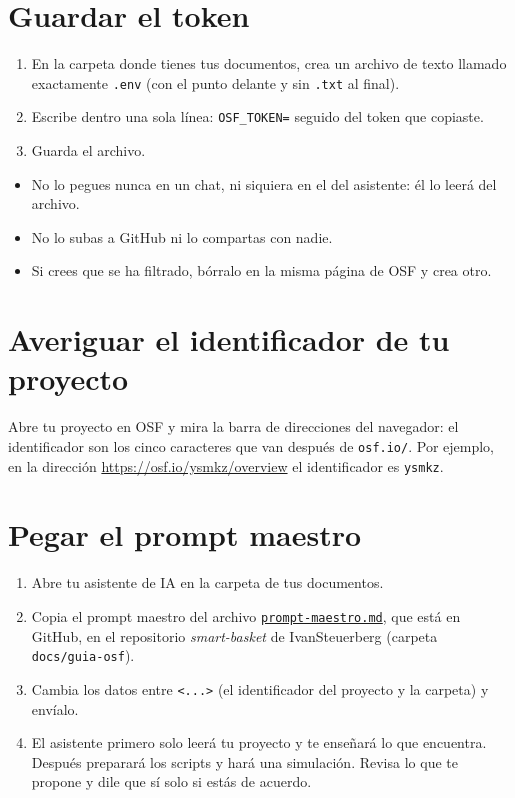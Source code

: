 \documentclass[11pt,a4paper]{article}
\begin{document}
	\section{Guardar el token}
	\begin{enumerate}[itemsep=4pt]
		\item En la carpeta donde tienes tus documentos, crea un archivo de texto llamado exactamente \texttt{.env} (con el punto delante y sin \texttt{.txt} al final).
		\item Escribe dentro una sola línea: \texttt{OSF\_TOKEN=} seguido del token que copiaste.
		\item Guarda el archivo.
	\end{enumerate}

	\begin{tcolorbox}[colback=avisocolor, colframe=orange!70!black, title=Cuida tu token]
		\begin{itemize}
			\item No lo pegues nunca en un chat, ni siquiera en el del asistente: él lo leerá del archivo.
			\item No lo subas a GitHub ni lo compartas con nadie.
			\item Si crees que se ha filtrado, bórralo en la misma página de OSF y crea otro.
		\end{itemize}
	\end{tcolorbox}

	\section{Averiguar el identificador de tu proyecto}
	Abre tu proyecto en OSF y mira la barra de direcciones del navegador: el identificador son los cinco caracteres que van después de \texttt{osf.io/}. Por ejemplo, en la dirección \url{https://osf.io/ysmkz/overview} el identificador es \texttt{ysmkz}.

	\section{Pegar el prompt maestro}
	\begin{enumerate}[itemsep=4pt]
		\item Abre tu asistente de IA en la carpeta de tus documentos.
		\item Copia el prompt maestro del archivo \href{https://github.com/IvanSteuerberg/smart-basket/blob/main/docs/guia-osf/prompt-maestro.md}{\texttt{prompt-maestro.md}}, que está en GitHub, en el repositorio \textit{smart-basket} de IvanSteuerberg (carpeta \texttt{docs/guia-osf}).
		\item Cambia los datos entre \texttt{<...>} (el identificador del proyecto y la carpeta) y envíalo.
		\item El asistente primero solo leerá tu proyecto y te enseñará lo que encuentra. Después preparará los scripts y hará una simulación. Revisa lo que te propone y dile que sí solo si estás de acuerdo.
	\end{enumerate}
\end{document}
